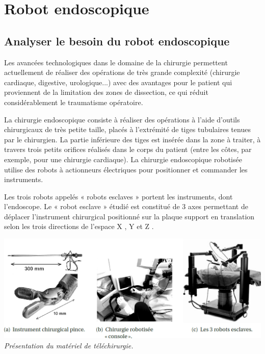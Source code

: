 \documentclass[10pt,fleqn]{article} %
\begin{document}

\section{Robot endoscopique}%

\subsection{Analyser le besoin du robot endoscopique\\}
Les avancées technologiques dans le domaine de la chirurgie permettent actuellement
de réaliser des opérations de très grande complexité (chirurgie cardiaque,
digestive, urologique...) avec des avantages pour le patient qui proviennent de la limitation
des zones de dissection, ce qui réduit considérablement le traumatisme
opératoire.

La chirurgie endoscopique consiste à réaliser des opérations à
l’aide d’outils chirurgicaux de très petite taille, placés à l’extrémité
de tiges tubulaires tenues par le chirurgien. La partie inférieure des
tiges est insérée dans la zone à traiter, à travers trois petits orifices
réalisés dans le corps du patient (entre les côtes, par exemple, pour
une chirurgie cardiaque).
La chirurgie endoscopique robotisée utilise des robots à actionneurs
électriques pour positionner et commander les instruments.

Les trois robots appelés « robots esclaves » portent les instruments,
dont l’endoscope.
Le « robot esclave » étudié est constitué de 3 axes permettant de déplacer l’instrument
chirurgical positionné sur la plaque support en translation selon les trois directions
de l’espace X , Y et Z .

\begin{center}%
	\includegraphics[width=\linewidth]{images/img_02}
	\textit{Présentation du matériel de téléchirurgie.}
\end{center}
\end{document}
